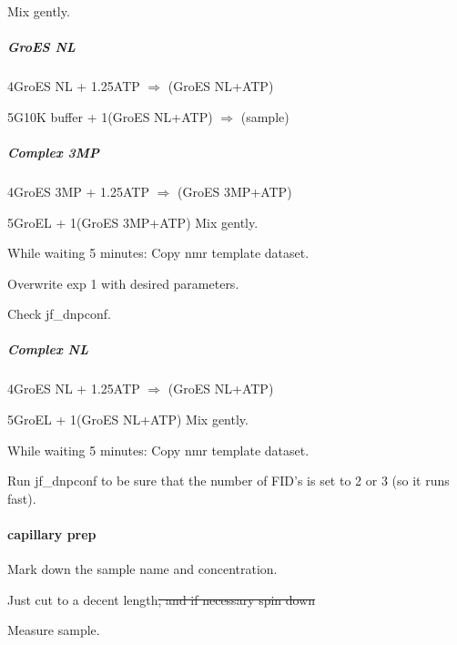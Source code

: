 Mix gently.

\subparagraph{GroES NL}
4\uL GroES NL + 1.25\M ATP $\Rightarrow$ (GroES NL+ATP)

5\uL G10K buffer + 1\uL (GroES NL+ATP) $\Rightarrow$ (sample)

\subparagraph{Complex 3MP}
4\uL GroES 3MP + 1.25\M ATP $\Rightarrow$ (GroES 3MP+ATP)

5\uL GroEL + 1\uL (GroES 3MP+ATP)
Mix gently.

While waiting 5 minutes:
Copy nmr template dataset.

Overwrite exp 1 with desired parameters.

Check jf\_dnpconf.

\subparagraph{Complex NL}
4\uL GroES NL + 1.25\M ATP $\Rightarrow$ (GroES NL+ATP)

5\uL GroEL + 1\uL (GroES NL+ATP)
Mix gently.

While waiting 5 minutes:
Copy nmr template dataset.

Run jf\_dnpconf to be sure that the number of FID's is set to 2 or 3 (so it runs fast).

\paragraph{capillary prep}

Mark down the sample name and concentration.

Just cut to a decent length\sout{, and if necessary spin down}

Measure sample.


